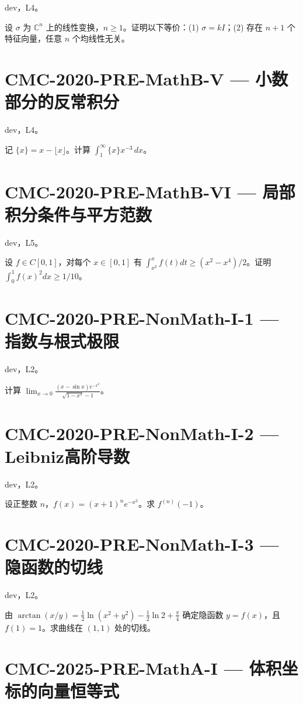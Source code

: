 \documentclass[UTF8]{ctexart}
\begin{document}
dev，L4。

设 $\sigma$ 为 $\mathbb C^n$ 上的线性变换，$n\ge1$。证明以下等价：(1) $\sigma=kI$；(2) 存在 $n+1$ 个特征向量，任意 $n$ 个均线性无关。

\section*{CMC-2020-PRE-MathB-V — 小数部分的反常积分}

dev，L4。

记 $\{x\}=x-\lfloor x\rfloor$。计算 $\displaystyle\int_1^\infty\{x\}x^{-3}\,dx$。

\section*{CMC-2020-PRE-MathB-VI — 局部积分条件与平方范数}

dev，L5。

设 $f\in C[0,1]$，对每个 $x\in[0,1]$ 有 $\int_{x^2}^x f(t)dt\ge(x^2-x^4)/2$。证明 $\int_0^1 f(x)^2dx\ge1/10$。

\section*{CMC-2020-PRE-NonMath-I-1 — 指数与根式极限}

dev，L2。

计算 $\displaystyle\lim_{x\to0}\frac{(x-\sin x)e^{-x^2}}{\sqrt{1-x^3}-1}$。

\section*{CMC-2020-PRE-NonMath-I-2 — Leibniz高阶导数}

dev，L2。

设正整数 $n$，$f(x)=(x+1)^n e^{-x^2}$。求 $f^{(n)}(-1)$。

\section*{CMC-2020-PRE-NonMath-I-3 — 隐函数的切线}

dev，L2。

由 $\arctan(x/y)=\tfrac12\ln(x^2+y^2)-\tfrac12\ln2+\tfrac\pi4$ 确定隐函数 $y=f(x)$，且 $f(1)=1$。求曲线在 $(1,1)$ 处的切线。

\section*{CMC-2025-PRE-MathA-I — 体积坐标的向量恒等式}
\end{document}
